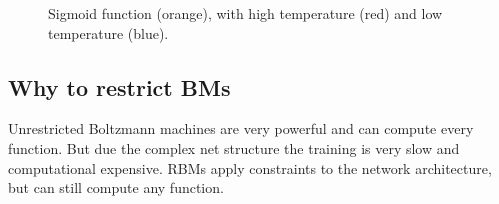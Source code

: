 \begin{figure}
\centering
{}
\caption{Sigmoid function (orange), with high temperature (red) and low temperature (blue).}
\label{fig:bm-simulated-annealing}
\end{figure}

\subsection{Why to restrict BMs}
Unrestricted Boltzmann machines are very powerful and can compute every function. But due the complex net structure the training is very slow and computational expensive.
\Glspl{RBM} apply constraints to the network architecture, but can still compute any function.


